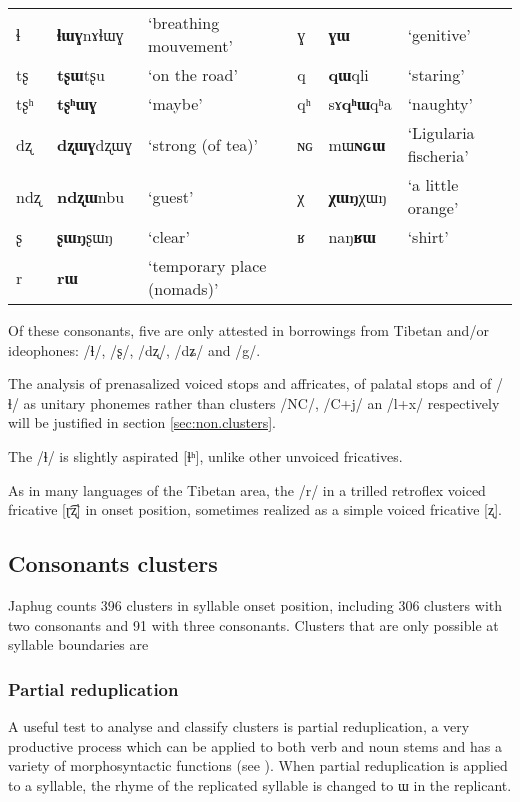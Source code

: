\documentclass[oldfontcommands,oneside,a4paper,11pt]{article}
\newcommand{\ipa}[1]{{\phon #1}} %
\begin{document}
\begin{table}
{\begin{tabular}{lll|lll}
ɬ   & 	  \ipa{\textbf{ɬɯɣ}nɤɬɯɣ}   & 	 `breathing mouvement' & 	ɣ & 	\ipa{\textbf{ɣɯ}}   & 	 `genitive' \\ 
tʂ   & 	  \ipa{\textbf{tʂɯ}tʂu}   & 	 `on the road' & 	q & 	\ipa{\textbf{qɯ}qli}   & 	 `staring' \\ 
tʂʰ   & 	  \ipa{\textbf{tʂʰɯɣ}}   & 	 `maybe' & 	qʰ & 	\ipa{sɤ\textbf{qʰɯ}qʰa}   & 	 `naughty' \\ 
dʐ   & 	\ipa{\textbf{dʐɯɣ}dʐɯɣ}   & 	 `strong (of tea)' & 	ɴɢ & 	\ipa{mɯ\textbf{ɴɢɯ}}  & 	 `Ligularia fischeria' \\ 
ndʐ & 	\ipa{\textbf{ndʐɯ}nbu}   & 	 `guest' & 	χ & 	\ipa{\textbf{χɯŋ}χɯŋ}   & 	 `a little orange' \\ 
ʂ & 	\ipa{\textbf{ʂɯŋ}ʂɯŋ}   & 	 `clear' & 	ʁ & 	\ipa{naŋ\textbf{ʁɯ}}   & 	 `shirt' \\ 
r & 	\ipa{\textbf{rɯ}}   & 	 `temporary place (nomads)' & 	  & 	 & 	 \\ 
\bottomrule
\end{tabular}}
\end{table}

Of these consonants, five are only attested in borrowings from Tibetan and/or ideophones: /ɬ/, /ʂ/, /dʐ/, /dʑ/ and /g/.

The analysis of prenasalized voiced stops and affricates, of palatal stops and of /ɬ/ as unitary phonemes rather than clusters /NC/, /C+j/ an /l+x/ respectively will be justified in section \ref{sec:non.clusters}. 

The /ɬ/ is slightly aspirated [ɬʰ], unlike other unvoiced fricatives.


As in many languages of the Tibetan area, the /r/ in a trilled retroflex voiced fricative [ɽ͡ʐ] in onset position, sometimes realized as a simple voiced fricative [ʐ].


  \subsection{Consonants clusters} \label{sec:clusters}
  Japhug counts 396 clusters in syllable onset position, including  306 clusters with two consonants and 91 with three consonants. Clusters that are only possible at syllable boundaries are
  
  \subsubsection{Partial reduplication} \label{sec:redp}
 A useful test to analyse and classify clusters is partial reduplication, a very productive process which can be applied to both verb and noun stems and has a variety of morphosyntactic functions (see \citealt{jacques07redupl}). When partial reduplication is applied to a syllable, the rhyme of the replicated syllable is changed to \ipa{ɯ} in the replicant.
 
\end{document}
